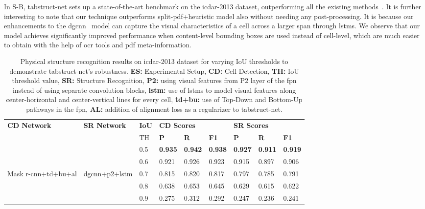 \documentclass[runningheads]{llncs}
\begin{document}
In S-B, {\sc t}ab{\sc s}truct-{\sc n}et sets up a state-of-the-art benchmark on the {\sc icdar}-2013 dataset, outperforming all the existing methods~\cite{qasim2019rethinking,table_splitting,chi2019complicated,paliwal2019tablenet}. It is further interesting to note that our technique outperforms {\sc s}plit-{\sc pdf}+{\sc h}euristic model also without needing any post-processing. It is because our enhancements to the {\sc dgcnn}~\cite{qasim2019rethinking} model can capture the visual characteristics of a cell across a larger span through {\sc lstm}s. We observe that our model achieves significantly improved performance when content-level bounding boxes are used instead of cell-level, which are much easier to obtain with the help of {\sc ocr} tools and {\sc pdf} meta-information.

\begin{table}[ht!]
\addtolength{\tabcolsep}{-1.0pt}
\begin{center}
\begin{tabular}{|l |l| l| l l l| l l l|} \hline
\textbf{CD Network} & \textbf{SR Network} &\textbf{IoU} &\multicolumn{3}{l|}{\textbf{CD Scores}} &\multicolumn{3}{l|}{\textbf{SR Scores}} \\ \cline{4-9}
 &  &{TH} &\textbf{P} &\textbf{R} &\textbf{F1} &\textbf{P} &\textbf{R} &\textbf{F1} \\ \hline
 &  &0.5	&\textbf{0.935} &\textbf{0.942} &\textbf{0.938} &\textbf{0.927} &\textbf{0.911}	&\textbf{0.919} \\  
 &      &0.6 &0.921 &0.926	&0.923 &0.915 &0.897 &0.906 \\
Mask {\sc r-cnn}+{\sc td}+{\sc bu}+{\sc al} &{\sc dgcnn}+{\sc p}2+{\sc lstm}  &0.7 &0.815 &0.820	&0.817 &0.797 &0.785 &0.791  \\
 &      &0.8 &0.638 &0.653	&0.645 &0.629 &0.615 &0.622 \\
 &      &0.9 &0.275 &0.312	&0.292 &0.247 &0.236 &0.241 \\ \hline
 \end{tabular}
\end{center}
\caption{Physical structure recognition results on {\sc icdar}-2013 dataset for varying IoU thresholds to demonstrate {\sc t}ab{\sc s}truct-{\sc n}et's robustness. \textbf{ES:} Experimental Setup, \textbf{CD:} Cell Detection, \textbf{TH:} IoU threshold value, \textbf{SR:} Structure Recognition, \textbf{P2:} using visual features from P2 layer of the {\sc fpn} instead of using separate convolution blocks, \textbf{{\sc lstm}:} use of {\sc lstm}s to model visual features along center-horizontal and center-vertical lines for every cell, \textbf{{\sc td}+{\sc bu}:} use of Top-Down and Bottom-Up pathways in the {\sc fpn}, \textbf{AL:} addition of alignment loss as a regularizer to {\sc t}ab{\sc s}truct-{\sc n}et. \label{table_varying_ious_physical_icdar_2013}}
\vspace{-1.0em}
\end{table}
\end{document}
